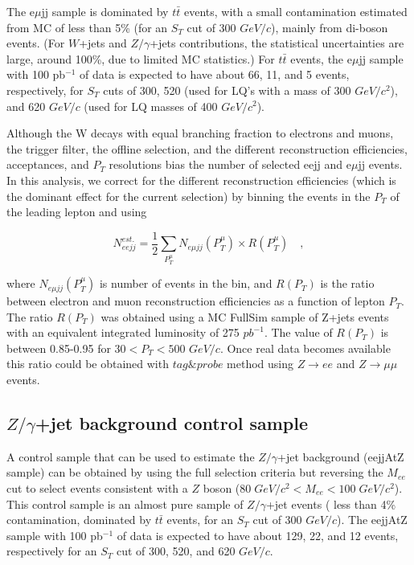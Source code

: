 \documentclass{cmspaper}
\begin{document}
\begin{linenumbers}
The e$\mu$jj sample is dominated by $t\bar{t}$ events, 
with a small contamination estimated from MC of less than 5\% (for an 
$S_{T}$ cut of 300 $GeV/c$), 
mainly from di-boson events. (For $W$+jets and $Z/\gamma$+jets 
contributions, the statistical 
uncertainties are large, around 100\%, due to limited MC statistics.) 
For $t\bar{t}$ events, the e$\mu$jj sample with 100 pb$^{-1}$ of data 
is expected to have about 66, 11, and 5 events, respectively, 
for $S_{T}$ cuts of 300, 520 (used for LQ's with a mass of
300 $GeV/c^2$), and 620 $GeV/c$ (used for LQ masses of 400 $GeV/c^2$).

Although the W decays with equal branching fraction to electrons and muons,
the trigger filter, the offline selection, and the 
different reconstruction efficiencies,
acceptances, and $P_{T}$ resolutions  bias the number of selected eejj 
and e$\mu$jj events. 
In this analysis, we correct for the different reconstruction efficiencies
(which is the dominant effect for the current selection) by
binning the events in the $P_T$ of the leading lepton and using

\begin{equation} \label{formula:NeejFromNemujj}
N_{eejj}^{est.} = \frac{1}{2}\sum_{P_{T}^{\mu}} N_{e\mu jj}(P_{T}^{\mu}) \times R(P_{T}^{\mu}) \quad , 
\end{equation}

where $N_{e\mu jj}(P_{T}^{\mu})$ is number of events in the bin, 
and $R(P_{T})$ is the ratio between electron 
and muon reconstruction efficiencies as a function of lepton $P_{T}$. 
The ratio $R(P_{T})$ was obtained 
using a MC FullSim sample of Z+jets 
events with an equivalent integrated luminosity of 275 $pb^{-1}$.
The value of $R(P_{T})$ is between 0.85-0.95 for $30 < P_{T} < 500$ $GeV/c$.
Once real data becomes available this ratio could be obtained with $tag\&probe$ method using $Z \rightarrow ee$ and 
$Z \rightarrow \mu\mu$ events.

\subsection{$Z/\gamma$+jet background control sample} \label{sec:ZcontrolSample}

A control sample that can be used to
estimate the $Z/\gamma$+jet background (eejjAtZ sample) 
can be obtained by using the full selection criteria but reversing 
the $M_{ee}$ cut to select events consistent with a $Z$ boson
($80\; GeV/c^2 < M_{ee} < 100\; GeV/c^2$). 
This control sample is an almost pure sample of  
$Z/\gamma$+jet events 
( less than 4\% contamination, dominated by $t\bar{t}$ events, 
for an $S_{T}$ cut of 300 $GeV/c$). 
The eejjAtZ sample with 100 pb$^{-1}$ of data 
is expected to have about 129, 22, and 12 events, respectively for an $S_{T}$ cut of 300, 520, and 620 $GeV/c$.


\end{linenumbers}
\end{document}
